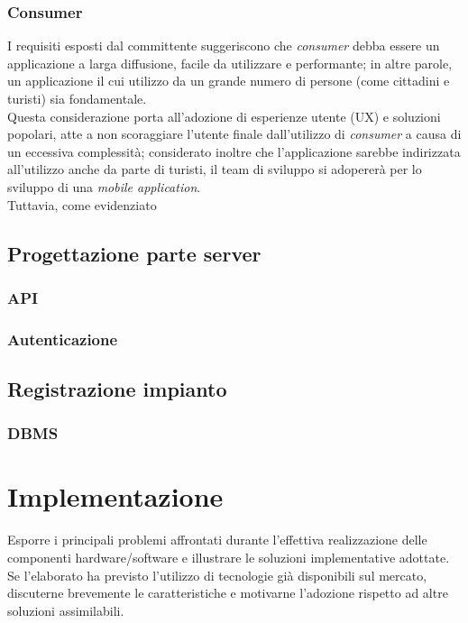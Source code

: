 \documentclass[12pt]{article}
\begin{document}
\subsubsection{Consumer}
I requisiti esposti dal committente suggeriscono che \textit{consumer} debba essere un applicazione a larga diffusione, facile da utilizzare e performante; in altre parole, un applicazione il cui utilizzo da un grande numero di persone (come cittadini e turisti) sia fondamentale.\\
Questa considerazione porta all'adozione di esperienze utente (UX) e soluzioni popolari, atte a non scoraggiare l'utente finale dall'utilizzo di \textit{consumer} a causa di un eccessiva complessità; considerato inoltre che l'applicazione sarebbe indirizzata all'utilizzo anche da parte di turisti, il team di sviluppo si adopererà per lo sviluppo di una \textit{mobile application}.\\
Tuttavia, come evidenziato
\subsection{Progettazione parte server}
\subsubsection{API}
\subsubsection{Autenticazione}
\subsection{Registrazione impianto}
\subsubsection{DBMS}
\newpage

\section{Implementazione}\label{sec:implementazione}

Esporre i principali problemi affrontati durante l'effettiva realizzazione delle componenti hardware/software e illustrare le soluzioni implementative adottate. Se l'elaborato ha previsto l'utilizzo di tecnologie già disponibili sul mercato, discuterne brevemente le caratteristiche e motivarne l'adozione rispetto ad altre soluzioni assimilabili.\\
\end{document}
